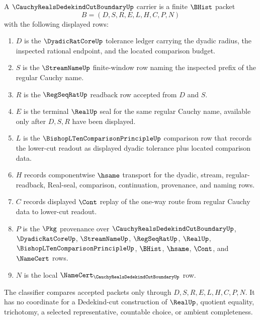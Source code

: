 \begin{definition}
\label{def:cauchy-reals-dedekind-cut-boundary-carrier}
A $\CauchyRealsDedekindCutBoundaryUp$ carrier is a finite $\BHist$ packet
$$
B=(D,S,R,E,L,H,C,P,N)
$$
with the following displayed rows:
\begin{enumerate}
\item $D$ is the $\DyadicRatCoreUp$ tolerance ledger carrying the dyadic radius, the inspected rational endpoint, and the located comparison budget.
\item $S$ is the $\StreamNameUp$ finite-window row naming the inspected prefix of the regular Cauchy name.
\item $R$ is the $\RegSeqRatUp$ readback row accepted from $D$ and $S$.
\item $E$ is the terminal $\RealUp$ seal for the same regular Cauchy name, available only after $D,S,R$ have been displayed.
\item $L$ is the $\BishopLTenComparisonPrincipleUp$ comparison row that records the lower-cut readout as displayed dyadic tolerance plus located comparison data.
\item $H$ records componentwise $\hsame$ transport for the dyadic, stream, regular-readback, Real-seal, comparison, continuation, provenance, and naming rows.
\item $C$ records displayed $\Cont$ replay of the one-way route from regular Cauchy data to lower-cut readout.
\item $P$ is the $\Pkg$ provenance over $\CauchyRealsDedekindCutBoundaryUp$, $\DyadicRatCoreUp$, $\StreamNameUp$, $\RegSeqRatUp$, $\RealUp$, $\BishopLTenComparisonPrincipleUp$, $\BHist$, $\hsame$, $\Cont$, and $\NameCert$ rows.
\item $N$ is the local $\NameCert_{\CauchyRealsDedekindCutBoundaryUp}$ row.
\end{enumerate}
The classifier compares accepted packets only through $D,S,R,E,L,H,C,P,N$. It has no coordinate for a Dedekind-cut construction of $\RealUp$, quotient equality, trichotomy, a selected representative, countable choice, or ambient completeness.
\end{definition}


